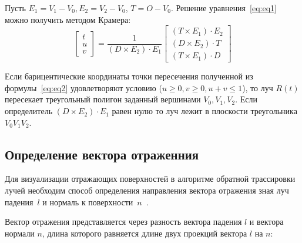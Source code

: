 Пусть $E_1 = V_1 - V_0, E_2 = V_2 - V_0$, $T=O - V_0$. Решение уравнения~\ref{eq:eq1} можно получить методом Крамера:
\begin{equation}\label{eq:eq2}
	\begin{bmatrix}
		t\\
		u\\
		v
	\end{bmatrix} = \frac{1}{(D\times E_2) \cdot E_1}
	\begin{bmatrix}
		(T\times E_1) \cdot E_2\\
		(D\times E_2) \cdot T\\
		(T\times E_1) \cdot D
	\end{bmatrix}
\end{equation}
 
Если барицентические координаты точки пересечения полученной из формулы~\ref{eq:eq2} удовлетворяют условию ($u \geq 0, v \geq 0, u + v \leq 1$), то луч $R(t)$ пересекает треугольный полигон заданный вершинами $V_0, V_1, V_2$. Если определитель $(D\times E_2) \cdot E_1$ равен нулю то луч лежит в плоскости треугольника $V_0V_1V_2$.


%

\subsection{Определение вектора отраженния}

Для визуализации отражающих поверхностей в алгоритме обратной трассировки лучей необходим способ определения направления вектора отражения зная луч падения~$l$ и нормаль к поверхности~$n$~\cite{rtOneWeekend}.


Вектор отражения представляется через разность вектора падения $l$ и вектора нормали $n$, длина которого равняется длине двух проекций вектора $l$ на $n$:

